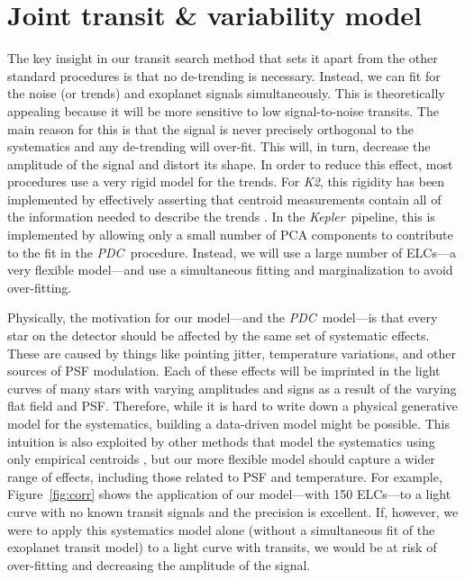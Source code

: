\documentclass[12pt,preprint]{aastex}
\newcommand{\project}[1]{\textsl{#1}} %
\newcommand{\kepler}{\project{Kepler}}
\newcommand{\KT}{\project{K2}}
\newcommand{\pdc}{\project{PDC}}
\newcommand{\figref}[1]{\ref{fig:#1}}
\newcommand{\Fig}[1]{Figure~\figref{#1}}
\newcommand{\sectlabel}[1]{\label{sect:#1}}
\begin{document}
\section{Joint transit \& variability model}
\sectlabel{model}

The key insight in our transit search method that sets it apart from the
other standard procedures is that no de-trending is necessary.
Instead, we can fit for the noise (or trends) and exoplanet signals simultaneously.
This is theoretically appealing because it will be more sensitive to low
signal-to-noise transits.
The main reason for this is that the signal is never precisely orthogonal to the
systematics and any de-trending will over-fit.
This will, in turn, decrease the amplitude of the
signal and distort its shape.
In order to reduce this effect, most procedures use a very rigid model for
the trends.
For \KT, this rigidity has been implemented by
effectively asserting that centroid measurements contain
all of the information needed to describe the trends \citep{Vanderburg:2014,
Aigrain:2015, Crossfield:2015}.
In the \kepler\ pipeline, this is implemented by allowing only a small number
of PCA components to contribute to the fit in the \pdc\ procedure.
Instead, we will use a large number of ELCs---a very flexible model---and
use a simultaneous fitting and marginalization to avoid over-fitting.

Physically, the motivation for our model---and the \pdc\ model---is that every
star on the detector should be affected by the same set of systematic effects.
These are caused by things like pointing jitter, temperature variations, and
other sources of PSF modulation.
Each of these effects will be imprinted in the light
curves of many stars with varying amplitudes and signs as a result of the
varying flat field and PSF.
Therefore, while it is hard to write down a physical generative model for the
systematics, building a data-driven model might be possible.
This intuition is also exploited by other methods that model the systematics
using only empirical centroids \citep{Vanderburg:2014, Aigrain:2015,
Crossfield:2015}, but our more flexible model should capture a wider range of
effects, including those related to PSF and temperature.
For example, \Fig{corr} shows the application of our model---with 150
ELCs---to a light curve with no known transit signals and the precision is
excellent.
If, however, we were to apply this systematics model alone (without a simultaneous fit
of the exoplanet transit model) to a light curve with
transits, we would be at risk of over-fitting and decreasing the amplitude of
the signal.
\end{document}
